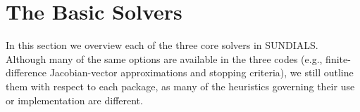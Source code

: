 \section{The Basic Solvers}\label{s:basic_solvers}

In this section we overview each of the three core solvers in SUNDIALS.
Although many of the same options are available in the three codes 
(e.g., finite-difference Jacobian-vector approximations 
and stopping criteria), we still outline them with respect to each package,
as many of the heuristics governing their use or 
implementation are different.

